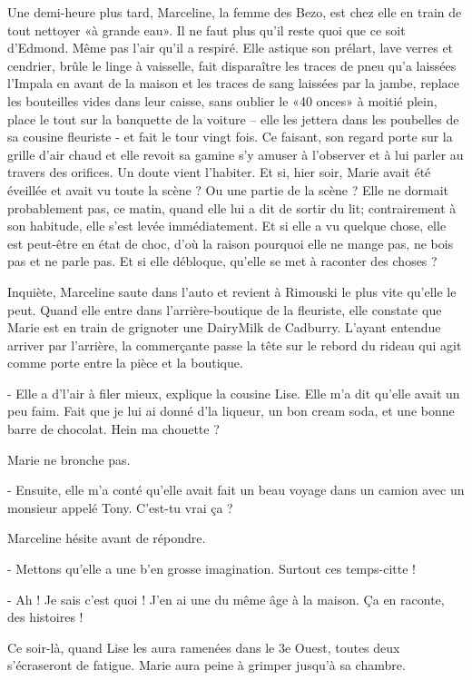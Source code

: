 Une demi-heure plus tard, Marceline, la femme des Bezo, est chez elle en train de tout nettoyer «à grande eau». Il ne faut plus qu’il reste quoi que ce soit d’Edmond. Même pas l’air qu’il a respiré. Elle astique son prélart, lave verres et cendrier, brûle le linge à vaisselle, fait disparaître les traces de pneu qu’a laissées l’Impala en avant de la maison et les traces de sang laissées par la jambe, replace les bouteilles vides dans leur caisse, sans oublier le «40 onces» à moitié plein, place le tout sur la banquette de la voiture – elle les jettera dans les poubelles de sa cousine fleuriste - et fait le tour vingt fois. Ce faisant, son regard porte sur la grille d’air chaud et elle revoit sa gamine s’y amuser à l’observer et à lui parler au travers des orifices. Un doute vient l’habiter. Et si, hier soir, Marie avait été éveillée et avait vu toute la scène ? Ou une partie de la scène ? Elle ne dormait probablement pas, ce matin, quand elle lui a dit de sortir du lit; contrairement à son habitude, elle s’est levée immédiatement. Et si elle a vu quelque chose, elle est peut-être en état de choc, d’où la raison pourquoi elle ne mange pas, ne bois pas et ne parle pas. Et si elle débloque, qu’elle se met à raconter des choses ?

Inquiète, Marceline saute dans l’auto et revient à Rimouski le plus vite qu’elle le peut. Quand elle entre dans l’arrière-boutique de la fleuriste, elle constate que Marie est en train de grignoter une DairyMilk de Cadburry. L’ayant entendue arriver par l’arrière, la commerçante passe la tête sur le rebord du rideau qui agit comme porte entre la pièce et la boutique.

- Elle a d’l’air à filer mieux, explique la cousine Lise. Elle m’a dit qu’elle avait un peu faim. Fait que je lui ai donné d’la liqueur, un bon cream soda, et une bonne barre de chocolat. Hein ma chouette ?

Marie ne bronche pas.

- Ensuite, elle m’a conté qu’elle avait fait un beau voyage dans un camion avec un monsieur appelé Tony. C’est-tu vrai ça ?

Marceline hésite avant de répondre.

- Mettons qu’elle a une b’en grosse imagination. Surtout ces temps-citte !

- Ah ! Je sais c’est quoi ! J’en ai une du même âge à la maison. Ça en raconte, des histoires !

Ce soir-là, quand Lise les aura ramenées dans le 3e Ouest, toutes deux s’écraseront de fatigue. Marie aura peine à grimper jusqu’à sa chambre.


